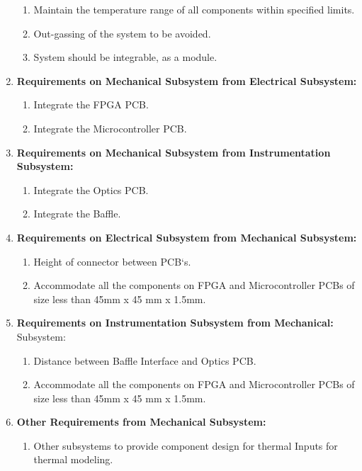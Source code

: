 \documentclass[../../main.tex]{subfiles}
\begin{document}
\begin{enumerate}
\begin{enumerate}
        \item Maintain the temperature range of all components within specified limits.
        \item Out-gassing of the system to be avoided.
        \item System should be integrable, as a module.
    \end{enumerate}
    \item \textbf{Requirements on Mechanical Subsystem from Electrical Subsystem:}
    \begin{enumerate}
        \item Integrate the FPGA PCB.
        \item Integrate the Microcontroller PCB.
    \end{enumerate}
    \item \textbf{Requirements on Mechanical Subsystem from Instrumentation Subsystem:}
    \begin{enumerate}
        \item Integrate the Optics PCB.
        \item Integrate the Baffle.
    \end{enumerate} 
    \item \textbf{Requirements on Electrical Subsystem from Mechanical Subsystem:}
    \begin{enumerate}
        \item Height of connector between PCB`s.
        \item Accommodate all the components on FPGA and Microcontroller PCBs of size less than 45mm x 45 mm x 1.5mm. 
    \end{enumerate}
    \item \textbf{Requirements on Instrumentation Subsystem from Mechanical:} Subsystem:
    \begin{enumerate}
        \item Distance between Baffle Interface and Optics PCB.
        \item Accommodate all the components on FPGA and Microcontroller PCBs of size less than 45mm x 45 mm x 1.5mm.
    \end{enumerate}
    \item \textbf{Other Requirements from Mechanical Subsystem:}
    \begin{enumerate}
        \item Other subsystems to provide component design for thermal Inputs for thermal modeling.
    \end{enumerate}

\end{enumerate}
\end{document}
